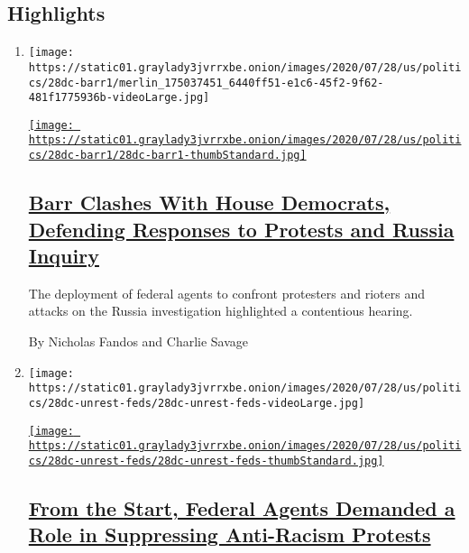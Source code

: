 \hypertarget{highlights}{%
\subsection{Highlights}\label{highlights}}

\begin{enumerate}
\def\labelenumi{\arabic{enumi}.}
\item
  \texttt{[image: https://static01.graylady3jvrrxbe.onion/images/2020/07/28/us/politics/28dc-barr1/merlin\_175037451\_6440ff51-e1c6-45f2-9f62-481f1775936b-videoLarge.jpg]}

  \href{/2020/07/28/us/politics/barr-testimony.html}{\texttt{[image: https://static01.graylady3jvrrxbe.onion/images/2020/07/28/us/politics/28dc-barr1/28dc-barr1-thumbStandard.jpg]}}

  \hypertarget{barr-clashes-with-house-democrats-defending-responses-to-protests-and-russia-inquiry}{%
  \subsection{\texorpdfstring{\href{/2020/07/28/us/politics/barr-testimony.html}{Barr
  Clashes With House Democrats, Defending Responses to Protests and
  Russia
  Inquiry}}{Barr Clashes With House Democrats, Defending Responses to Protests and Russia Inquiry}}\label{barr-clashes-with-house-democrats-defending-responses-to-protests-and-russia-inquiry}}

  The deployment of federal agents to confront protesters and rioters
  and attacks on the Russia investigation highlighted a contentious
  hearing.

  By Nicholas Fandos and Charlie Savage
\item
  \texttt{[image: https://static01.graylady3jvrrxbe.onion/images/2020/07/28/us/politics/28dc-unrest-feds/28dc-unrest-feds-videoLarge.jpg]}

  \href{/2020/07/28/us/federal-agents-portland-seattle-protests.html}{\texttt{[image: https://static01.graylady3jvrrxbe.onion/images/2020/07/28/us/politics/28dc-unrest-feds/28dc-unrest-feds-thumbStandard.jpg]}}

  \hypertarget{from-the-start-federal-agents-demanded-a-role-in-suppressing-anti-racism-protests}{%
  \subsection{\texorpdfstring{\href{/2020/07/28/us/federal-agents-portland-seattle-protests.html}{From
  the Start, Federal Agents Demanded a Role in Suppressing Anti-Racism
  Protests}}{From the Start, Federal Agents Demanded a Role in Suppressing Anti-Racism Protests}}\label{from-the-start-federal-agents-demanded-a-role-in-suppressing-anti-racism-protests}}


\end{enumerate}
